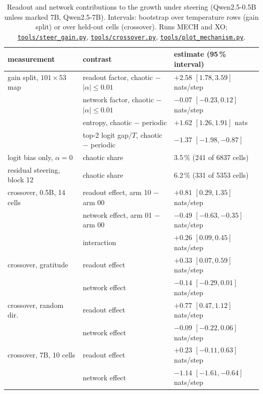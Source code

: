 \documentclass[11pt,letterpaper]{article}
\newcommand{\repourl}{https://github.com/tdj28/neural-shrimp}
\newcommand{\reporef}{arxiv-v1}
\newcommand{\repo}[1]{\href{\repourl/blob/\reporef/#1}{\nolinkurl{#1}}}
\begin{document}
\begin{table}[!htb]
\centering\small
\begin{tabular}{lll}
\toprule
measurement & contrast & estimate (95\,\% interval) \\
\midrule
gain split, $101\times53$ map & readout factor, chaotic $-$ $|\alpha|\le0.01$ & $+2.58$ $[1.78,3.59]$ nats/step \\
 & network factor, chaotic $-$ $|\alpha|\le0.01$ & $-0.07$ $[-0.23,0.12]$ nats/step \\
 & entropy, chaotic $-$ periodic & $+1.62$ $[1.26,1.91]$ nats \\
 & top-2 logit gap$/T$, chaotic $-$ periodic & $-1.37$ $[-1.98,-0.87]$ \\
logit bias only, $\alpha=0$ & chaotic share & 3.5\,\% (241 of 6837 cells) \\
residual steering, block 12 & chaotic share & 6.2\,\% (331 of 5353 cells) \\
crossover, 0.5B, 14 cells & readout effect, arm 10 $-$ arm 00 & $+0.81$ $[0.29,1.35]$ nats/step \\
 & network effect, arm 01 $-$ arm 00 & $-0.49$ $[-0.63,-0.35]$ nats/step \\
 & interaction & $+0.26$ $[0.09,0.45]$ nats/step \\
crossover, gratitude & readout effect & $+0.33$ $[0.07,0.59]$ nats/step \\
 & network effect & $-0.14$ $[-0.29,0.01]$ nats/step \\
crossover, random dir. & readout effect & $+0.77$ $[0.47,1.12]$ nats/step \\
 & network effect & $-0.09$ $[-0.22,0.06]$ nats/step \\
crossover, 7B, 10 cells & readout effect & $+0.23$ $[-0.11,0.63]$ nats/step \\
 & network effect & $-1.14$ $[-1.61,-0.64]$ nats/step \\
\bottomrule
\end{tabular}
\caption{Readout and network contributions to the growth under steering (Qwen2.5-0.5B unless marked 7B,
Qwen2.5-7B). Intervals: bootstrap over
temperature rows (gain split) or over held-out cells (crossover). Runs MECH and XO; \repo{tools/steer_gain.py}, \repo{tools/crossover.py},
\repo{tools/plot_mechanism.py}.}
\label{tab:mechanism}
\end{table}
\end{document}
